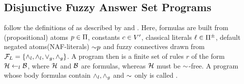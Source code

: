 \subsection{Disjunctive Fuzzy Answer Set Programs \protect\cite{Mushthofa2015}}

\citet{Mushthofy2015} follow the definitions of \fasptext as described by \citet{BlondeelSVD14} and \citet{JanssenSVD09}.
Here, formulas are built from (propositional) atoms $p\in\Pi$, constants $c\in V'$, classical literals $\ell\in\Pi^{\pm}$, default negated atoms(NAF-literals) $\mathord{\sim}p$ and fuzzy connectives drawn from \mbox{$\mathcal{F}_L=\left\{\land_l,\land_l,\lor_g,\land_g\right\}$}.
A \fasptext program then is a finite set of rules $r$ of the form $\mathcal{H}\overset{}{\gets}_l\mathcal{B}$, where $\mathcal{H}$ and $\mathcal{B}$ are formulas, whereas $\mathcal{H}$ must be $\mathord{\sim}$-free.
A program whose body formulas contain $\land_l,\land_g$ and $\mathord{\sim}$ only is called .

